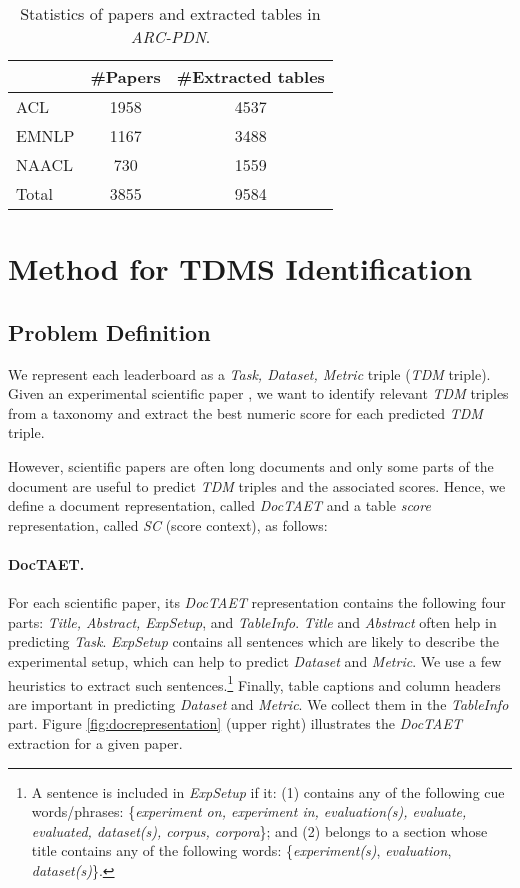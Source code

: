 \documentclass[11pt,a4paper]{article}
\begin{document}
\begin{table}[t]
\begin{center}
\begin{tabular}{lcc}
&\#Papers&\#Extracted tables \\ \hline
 ACL&1958&4537\\ \hline 
 EMNLP&1167&3488\\ \hline 
 NAACL&730&1559\\ \hline 
 Total&3855&9584\\ \hline 
\end{tabular}
\end{center}
\caption{\label{tab:ds2}  Statistics of papers and extracted tables in \emph{ARC-PDN}.}
\end{table}



\section{Method for TDMS Identification}
\label{sec:method}



\subsection{Problem Definition}
\label{sec:problemDef}
We represent each leaderboard as a \emph{Task, Dataset, Metric} triple (\emph{TDM} triple). Given an experimental scientific paper , we
want to identify relevant \emph{TDM} triples from a taxonomy and extract the best numeric score for each predicted \emph{TDM} triple.
 
However, scientific papers are often long documents and only some parts of the document are useful to predict \emph{TDM} triples and the associated scores. 
Hence, we define a document representation, called  \emph{DocTAET} and a table \textit{score} representation, called \emph{SC} (score context), as follows:

\paragraph{DocTAET.} For each scientific paper, its \emph{DocTAET} representation contains the following four parts: \emph{Title, Abstract, ExpSetup}, and \emph{TableInfo}.
\emph{Title} and \emph{Abstract} often help in predicting \emph{Task}. \emph{ExpSetup} contains all sentences which are likely to describe the experimental setup, which can help to predict \emph{Dataset} and \emph{Metric}. We use a few 
heuristics to extract such sentences.\footnote{A sentence is included in \emph{ExpSetup} if it: (1) contains any of the following cue words/phrases:
\{\emph{experiment on, experiment in, evaluation(s), evaluate, evaluated, dataset(s), corpus, corpora}\}; and (2) belongs to a section whose title contains any of the following words: \{\emph{experiment(s)}, \emph{evaluation}, \emph{dataset(s)}\}.}
Finally, table captions and column headers are important in predicting \emph{Dataset} and \emph{Metric}. We collect them in the \emph{TableInfo} part. 
Figure \ref{fig:docrepresentation} (upper right) illustrates the \emph{DocTAET} extraction for a given paper.
\end{document}
